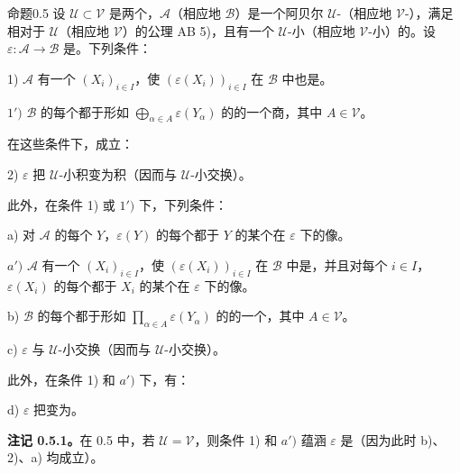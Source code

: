 \begin{SGAresult}{命题}{0.5}
设 $\mathcal U\subset\mathcal V$ 是两个，$\mathcal A$（相应地 $\mathcal B$）是一个阿贝尔 $\mathcal U$-（相应地 $\mathcal V$-），满足相对于 $\mathcal U$（相应地 $\mathcal V$）的公理 AB 5)，且有一个 $\mathcal U$-小（相应地 $\mathcal V$-小）的。设 $\varepsilon:\mathcal A\to\mathcal B$ 是。下列条件：

1) $\mathcal A$ 有一个 $(X_i)_{i\in I}$，使 $(\varepsilon(X_i))_{i\in I}$ 在 $\mathcal B$ 中也是。

$1')$ $\mathcal B$ 的每个都于形如 $\bigoplus_{\alpha\in A}\varepsilon(Y_\alpha)$ 的的一个商，其中 $A\in\mathcal V$。

在这些条件下，成立：

2) $\varepsilon$ 把 $\mathcal U$-小积变为积（因而与 $\mathcal U$-小交换）。

此外，在条件 1) 或 $1')$ 下，下列条件：

a) 对 $\mathcal A$ 的每个 $Y$，$\varepsilon(Y)$ 的每个都于 $Y$ 的某个在 $\varepsilon$ 下的像。

$a')$ $\mathcal A$ 有一个 $(X_i)_{i\in I}$，使 $(\varepsilon(X_i))_{i\in I}$ 在 $\mathcal B$ 中是，并且对每个 $i\in I$，$\varepsilon(X_i)$ 的每个都于 $X_i$ 的某个在 $\varepsilon$ 下的像。

b) $\mathcal B$ 的每个都于形如 $\prod_{\alpha\in A}\varepsilon(Y_\alpha)$ 的的一个，其中 $A\in\mathcal V$。

c) $\varepsilon$ 与 $\mathcal U$-小交换（因而与 $\mathcal U$-小交换）。

此外，在条件 1) 和 $a')$ 下，有：

d) $\varepsilon$ 把变为。
\end{SGAresult}
\textbf{注记 0.5.1。}在 0.5 中，若 $\mathcal U=\mathcal V$，则条件 1) 和 $a')$ 蕴涵 $\varepsilon$ 是（因为此时 b)、2)、a) 均成立）。
